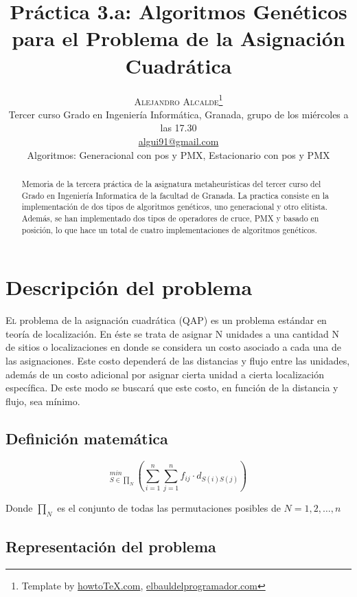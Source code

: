 \documentclass[twoside]{article}
\title{\vspace{-15mm}%
	\fontsize{24pt}{10pt}\selectfont
	\textbf{Práctica 3.a: Algoritmos Genéticos para el Problema de la
	Asignación Cuadrática}
	}
\author{%
	\large
	\textsc{Alejandro Alcalde}\thanks{Template by \href{http://www.howtotex.com}{howtoTeX.com}, \href{http://www.elbauldelprogramador.com}{elbauldelprogramador.com}} \\[2mm]
	\normalsize	Tercer curso Grado en Ingeniería Informática, Granada, grupo de los miércoles a las 17.30 \\
	\normalsize	\href{mailto:algui91@gmail.com}{algui91@gmail.com}	\\
	\normalsize Algoritmos: Generacional con pos y PMX, Estacionario con pos y PMX
	\vspace{-5mm}
	}
\date{}
\begin{document}
\maketitle
\thispagestyle{fancy}
\tableofcontents
\newpage

\begin{abstract}
\noindent Memoria de la tercera práctica de la asignatura metaheurísticas
del tercer curso del Grado en Ingeniería Informatica de la facultad de Granada.
La practica consiste en la implementación de dos tipos de algoritmos genéticos,
uno generacional y otro elitista. Además, se han implementado dos tipos
de operadores de cruce, PMX y basado en posición, lo que hace un total de
cuatro implementaciones de algoritmos genéticos.
\end{abstract}


\section{Descripción del problema}

\lettrine[nindent=0em,lines=3]{E}l problema de la asignación cuadrática (QAP) es un problema estándar en teoría de localización. En éste se trata de asignar N unidades a una cantidad N de sitios o localizaciones en donde se considera un costo asociado a cada una de las asignaciones. Este costo dependerá de las distancias y flujo entre las unidades, además de un costo adicional por asignar cierta unidad a cierta localización específica. De este modo se buscará que este costo, en función de la distancia y flujo, sea mínimo.

\subsection{Definición matemática}

\begin{displaymath}
_{S\in\prod _N}^{min}\left ( \sum_{i=1}^n \sum_{j=1}^n f_{ij} \cdot d_{S(i)S(j)}  \right )
\end{displaymath}

Donde $\prod _N$ es el conjunto de todas las permutaciones posibles de $N={1,2,\dots,n}$

\subsection{Representación del problema}
\end{document}
